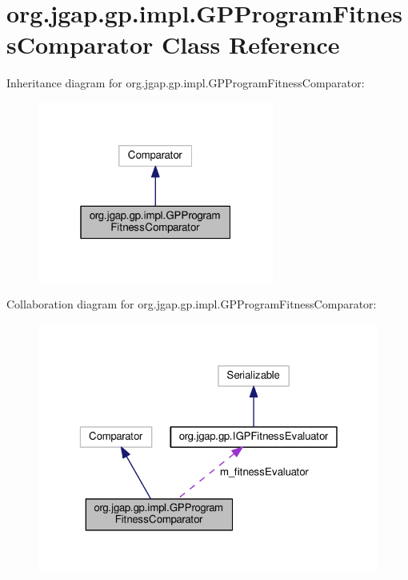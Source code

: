 \hypertarget{classorg_1_1jgap_1_1gp_1_1impl_1_1_g_p_program_fitness_comparator}{\section{org.\-jgap.\-gp.\-impl.\-G\-P\-Program\-Fitness\-Comparator Class Reference}
\label{classorg_1_1jgap_1_1gp_1_1impl_1_1_g_p_program_fitness_comparator}
}


Inheritance diagram for org.\-jgap.\-gp.\-impl.\-G\-P\-Program\-Fitness\-Comparator\-:
\nopagebreak
\begin{figure}[H]
\begin{center}
\leavevmode
\includegraphics[width=220pt]{classorg_1_1jgap_1_1gp_1_1impl_1_1_g_p_program_fitness_comparator__inherit__graph}
\end{center}
\end{figure}


Collaboration diagram for org.\-jgap.\-gp.\-impl.\-G\-P\-Program\-Fitness\-Comparator\-:
\nopagebreak
\begin{figure}[H]
\begin{center}
\leavevmode
\includegraphics[width=323pt]{classorg_1_1jgap_1_1gp_1_1impl_1_1_g_p_program_fitness_comparator__coll__graph}
\end{center}
\end{figure}
